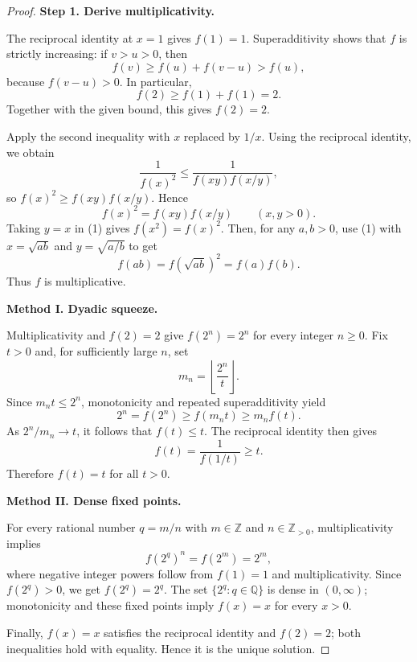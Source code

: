 
\begin{dlsummary}[title={\bfseries Solution 9. The Reflected Product},breakable]

\begin{proof}
\textbf{Step 1. Derive multiplicativity.}

The reciprocal identity at $x=1$ gives $f(1)=1$. Superadditivity shows that
$f$ is strictly increasing: if $v>u>0$, then
\[
f(v)\geq f(u)+f(v-u)>f(u),
\]
because $f(v-u)>0$. In particular,
\[
f(2)\geq f(1)+f(1)=2.
\]
Together with the given bound, this gives $f(2)=2$.

Apply the second inequality with $x$ replaced by $1/x$. Using the
reciprocal identity, we obtain
\[
\frac1{f(x)^2}\leq
\frac1{f(xy)f(x/y)},
\]
so $f(x)^2\geq f(xy)f(x/y)$. Hence
\[
f(x)^2=f(xy)f(x/y)\qquad(x,y>0). \tag{1}
\]
Taking $y=x$ in (1) gives $f(x^2)=f(x)^2$. Then, for any $a,b>0$,
use (1) with $x=\sqrt{ab}$ and $y=\sqrt{a/b}$ to get
\[
f(ab)=f(\sqrt{ab})^2=f(a)f(b).
\]
Thus $f$ is multiplicative.

\medskip
\noindent
\textbf{Method I. Dyadic squeeze.}

Multiplicativity and $f(2)=2$ give $f(2^n)=2^n$ for every integer
$n\geq0$. Fix $t>0$ and, for sufficiently large $n$, set
\[
m_n=\left\lfloor\frac{2^n}{t}\right\rfloor.
\]
Since $m_nt\leq2^n$, monotonicity and repeated superadditivity yield
\[
2^n=f(2^n)\geq f(m_nt)\geq m_nf(t).
\]
As $2^n/m_n\to t$, it follows that $f(t)\leq t$. The reciprocal
identity then gives
\[
f(t)=\frac1{f(1/t)}\geq t.
\]
Therefore $f(t)=t$ for all $t>0$.

\medskip
\noindent
\textbf{Method II. Dense fixed points.}

For every rational number $q=m/n$ with $m\in\mathbb Z$ and
$n\in\mathbb Z_{>0}$, multiplicativity implies
\[
f(2^q)^n=f(2^m)=2^m,
\]
where negative integer powers follow from $f(1)=1$ and
multiplicativity. Since $f(2^q)>0$, we get $f(2^q)=2^q$.
The set $\{2^q:q\in\mathbb Q\}$ is dense in $(0,\infty)$;
monotonicity and these fixed points imply $f(x)=x$ for every $x>0$.

Finally, $f(x)=x$ satisfies the reciprocal identity and $f(2)=2$;
both inequalities hold with equality. Hence it is the unique solution.
\end{proof}

\end{dlsummary}